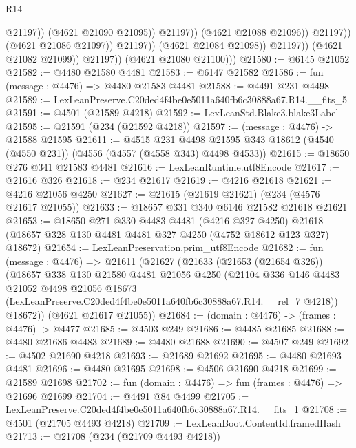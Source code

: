 \begin{lexlean}{R14}
\begin{coremodule}
                                          @21197))
                                      (@4621 @21090 @21095))
                                    @21197))
                                (@4621 @21088 @21096))
                              @21197))
                          (@4621 @21086 @21097))
                        @21197))
                    (@4621 @21084 @21098))
                  @21197))
              (@4621 @21082 @21099))
            @21197))
        (@4621 @21080 @21100)))
@21580 := @6145 @21052
@21582 := @4480 @21580 @4481
@21583 := @6147 @21582
@21586 := fun (message : @4476) => @4480 @21583 @4481
@21588 := @4491 @231 @4498
@21589 := LexLeanPreserve.C20ded4f4be0e5011a640fb6c30888a67.R14.__fits_5
@21591 := @4501 (@21589 @4218)
@21592 := LexLeanStd.Blake3.blake3Label
@21595 := @21591 (@234 (@21592 @4218))
@21597 := (message : @4476) -> @21588 @21595
@21611 := @4515
    @231
    @4498
    @21595
    @343
    @18612
    (@4540 (@4550 @231))
    (@4556 (@4557 (@4558 @343) @4498 @4533))
@21615 := @18650 @276 @341 @21583 @4481
@21616 := LexLeanRuntime.utf8Encode
@21617 := @21616 @326
@21618 := @234 @21617
@21619 := @4216 @21618
@21621 := @4216 @21056 @4250
@21627 := @21615 (@21619 @21621) (@234 (@4576 @21617 @21055))
@21633 := @18657 @331 @340 @6146 @21582 @21618 @21621
@21653 := @18650
    @271
    @330
    @4483
    @4481
    (@4216 @327 @4250)
    @21618
    (@18657 @328 @130 @4481 @4481 @327 @4250 (@4752 @18612 @123 @327) @18672)
@21654 := LexLeanPreservation.prim_utf8Encode
@21682 := fun (message : @4476) =>
  @21611
    (@21627
      (@21633
        (@21653 (@21654 @326))
        (@18657
          @338
          @130
          @21580
          @4481
          @21056
          @4250
          (@21104
            @336
            @146
            @4483
            @21052
            @4498
            @21056
            @18673
            (LexLeanPreserve.C20ded4f4be0e5011a640fb6c30888a67.R14.__rel_7 @4218))
          @18672))
      (@4621 @21617 @21055))
@21684 := (domain : @4476) -> (frames : @4476) -> @4477
@21685 := @4503 @249
@21686 := @4485 @21685
@21688 := @4480 @21686 @4483
@21689 := @4480 @21688
@21690 := @4507 @249
@21692 := @4502 @21690 @4218
@21693 := @21689 @21692
@21695 := @4480 @21693 @4481
@21696 := @4480 @21695
@21698 := @4506 @21690 @4218
@21699 := @21589 @21698
@21702 := fun (domain : @4476) => fun (frames : @4476) => @21696 @21699
@21704 := @4491 @84 @4499
@21705 := LexLeanPreserve.C20ded4f4be0e5011a640fb6c30888a67.R14.__fits_1
@21708 := @4501 (@21705 @4493 @4218)
@21709 := LexLeanBoot.ContentId.framedHash
@21713 := @21708 (@234 (@21709 @4493 @4218))

\end{coremodule}
\end{lexlean}
